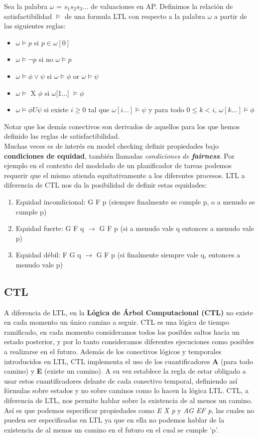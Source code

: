 \documentclass[titlepage, 12pt]{book}
\begin{document}
Sea la palabra $\omega$ = $s_1s_2s_3...$ de valuaciones en AP. Definimos la relaci\'on de satisfactibilidad $\models$ de una formula LTL con respecto a la palabra $\omega$ a partir de las siguientes reglas:
\begin{itemize}
\item $\omega \models p $ si $ p \in \omega[0]$
\item $\omega \models \neg p $ si no $\omega \models p$
\item $\omega \models \phi \vee \psi$ si $\omega \models \phi$ or $\omega \models \psi$
\item $\omega \models$ X $\phi$ si $\omega$[1...] $\models \phi$
\item $\omega \models \phi U \psi$ si existe $i \geq 0$ tal que  $\omega[i...] \models \psi$ y para todo $0 \leq k < i$, $\omega[k...] \models \phi$ 
\end{itemize}
Notar que los dem\'as conectivos son derivados de aquellos para los que hemos definido las reglas de satisfactibilidad. \\

Muchas veces es de inter\'es en model checking definir propiedades bajo \textbf{condiciones de equidad}, tambi\'en llamadas \textit{condiciones de \textbf{fairness}}. Por ejemplo en el contexto del modelado de un planificador de tareas podemos requerir que el mismo atienda equitativamente a los diferentes procesos. LTL a diferencia de CTL nos da la posibilidad de definir estas equidades:
\begin{enumerate}
\item Equidad incondicional: G F p (siempre finalmente se cumple p, o a menudo se cumple p)
\item Equidad fuerte: G F q $\rightarrow$ G F p (si a menudo vale q entonces a menudo vale p)
\item Equidad d\'ebil: F G q $\rightarrow$ G F p (si finalmente siempre vale q, entonces a menudo vale p)
\end{enumerate}


\subsection{CTL}
A diferencia de LTL, en la \textbf{L\'ogica de \'Arbol Computacional (CTL)} no existe en cada momento un \'unico camino a seguir. CTL es una l\'ogica de tiempo ramificado, en cada momento consideramos todos los posibles saltos hacia un estado posterior, y por lo tanto consideramos diferentes ejecuciones como posibles a realizarse en el futuro. Adem\'as de los conectivos l\'ogicos y temporales introducidos en LTL, CTL implementa el uso de los cuantificadores \textbf{A} (para todo camino) y \textbf{E} (existe un camino). A su vez establece la regla de estar obligado a usar estos cuantificadores delante de cada conectivo temporal, definiendo as\'i f\'ormulas sobre estados y no sobre caminos como lo hacen la l\'ogica LTL. CTL, a diferencia de LTL, nos permite hablar sobre la existencia de al menos un camino. Así es que podemos especificar propiedades como  \textit{E X p} y \textit{AG EF p}, las cuales no pueden ser especificadas en LTL ya que en ella no podemos hablar de la existencia de al menos un camino en el futuro en el cual se cumple 'p'.
\end{document}
